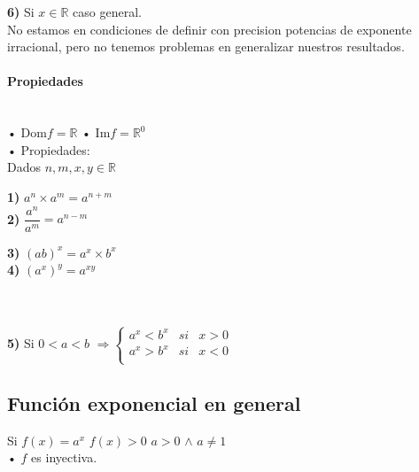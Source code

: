\textbf{6)} Si $x \in \mathbb{R}$ caso general.\\

\qquad No estamos en condiciones de definir con precision potencias de exponente irracional, pero no tenemos problemas en generalizar nuestros resultados.\\

\paragraph{Propiedades}
\qquad \\

• Dom$f = \mathbb{R}$ \qquad • Im$f= \mathbb{R}^0$\\

• Propiedades:\\

\quad	Dados $n,m,x,y \in \mathbb{R}$\\

\hfill
\begin{minipage}{.45\textwidth}


\textbf{1)} $ a^n \times a^m = a^{n+m}$\\
\textbf{2)} $\dfrac{a^n}{a^m} = a^{n-m}$

\end{minipage}
\hfill
\begin{minipage}{.45\textwidth}


\textbf{3)} $ (ab)^x = a^x \times b^x$\\
\textbf{4)} $(a^x)^y = a^{xy}$

\end{minipage}
\hfill \\
\qquad \\

\textbf{5)} Si $0 <a <b$ $\Rightarrow
\left\{
\begin{array}{ccc}
a^x<b^x & si & x>0 \\
a^x > b^x & si & x<0\\
\end{array}\right.$

\subsection{Función exponencial en general}

Si $f(x)=a^x$ \qquad $f(x)>0$ \qquad $a>0 $ $\wedge$ $ a\neq 1$\\

\qquad • $f$ es inyectiva.\\

